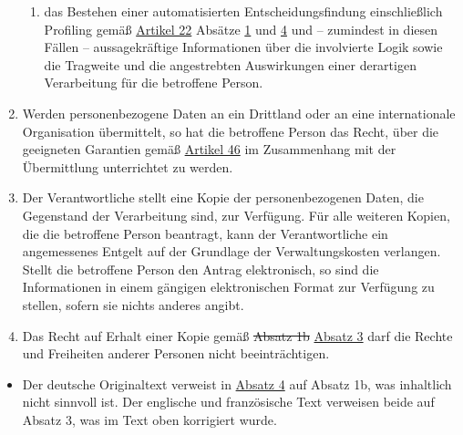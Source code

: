 \begin{enumerate}
\begin{enumerate}
    \item das Bestehen einer automatisierten Entscheidungsfindung einschließlich Profiling gemäß \hyperref[ch:22]
     {Artikel 22} Absätze \hyperref[itm:22-1]{1} und \hyperref[itm:22-4]{4} und -- zumindest in diesen Fällen --
     aussagekräftige Informationen über die involvierte Logik sowie die Tragweite und die angestrebten Auswirkungen
     einer derartigen Verarbeitung für die betroffene Person.
    \label{itm:15-1h}

  \end{enumerate}

  \item Werden personenbezogene Daten an ein Drittland oder an eine internationale Organisation übermittelt, so hat die
   betroffene Person das Recht, über die geeigneten Garantien gemäß \hyperref[ch:46]{Artikel 46} im Zusammenhang mit der
   Übermittlung unterrichtet zu werden.
  \label{itm:15-2}

  \item Der Verantwortliche stellt eine Kopie der personenbezogenen Daten, die Gegenstand der Verarbeitung sind, zur
   Verfügung. Für alle weiteren Kopien, die die betroffene Person beantragt, kann der Verantwortliche ein angemessenes
   Entgelt auf der Grundlage der Verwaltungskosten verlangen. Stellt die betroffene Person den Antrag elektronisch, so
   sind die Informationen in einem gängigen elektronischen Format zur Verfügung zu stellen, sofern sie nichts anderes
   angibt.
  \label{itm:15-3}

  \item Das Recht auf Erhalt einer Kopie gemäß \sout{Absatz 1b} \hyperref[itm:15-3]{Absatz 3} darf die Rechte und
   Freiheiten anderer Personen nicht beeinträchtigen.
  \label{itm:15-4}

\end{enumerate}


\begin{itemize}

  \item Der deutsche Originaltext verweist in \hyperref[itm:15-4]{Absatz 4} auf Absatz 1b, was inhaltlich nicht sinnvoll
   ist. Der englische und französische Text verweisen beide auf Absatz 3, was im Text oben korrigiert wurde.

\end{itemize}

